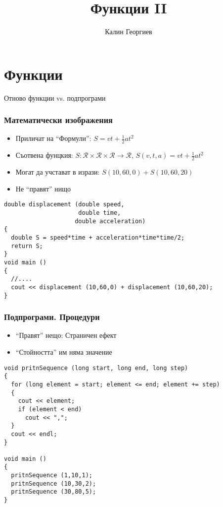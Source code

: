\documentclass{beamer}
\begin{document}
\title[Увод в програмирането]{Функции II}
\author{Калин Георгиев}
\frame{\titlepage}


\section{Функции}


\begin{frame}
\centerline{Отново функции vs. подпрограми}
\end{frame}



\begin{frame}[fragile]
\frametitle{Математически изображения}

\begin{itemize}
  \item Приличат на ``Формули'': $S=vt + \frac{1}{2}at^2$
\pause
  \item Съотвена фунцкия: $S:\mathcal{R}\times\mathcal{R}\times\mathcal{R}\rightarrow\mathcal{R}$, $S(v,t,a)=vt + \frac{1}{2}at^2$
\pause
  \item Могат да учстават в изрази: $S(10,60,0) + S(10,60,20)$
\pause
  \item Не ``правят'' нищо
\end{itemize}
\pause

\begin{flushleft}
\begin{lstlisting}
double displacement (double speed,
                     double time,
                    double acceleration)
{
  double S = speed*time + acceleration*time*time/2;
  return S;
}
void main ()
{
  //....
  cout << displacement (10,60,0) + displacement (10,60,20);
}

\end{lstlisting}

\end{flushleft}
\end{frame}


\begin{frame}[fragile]
\frametitle{Подпрограми. Процедури}

\begin{itemize}
  \item ``Правят'' нещо: Страничен ефект
  \item ``Стойността'' им няма значение
\end{itemize}



\begin{flushleft}
\begin{lstlisting}
void pritnSequence (long start, long end, long step)
{
  for (long element = start; element <= end; element += step)
  {
    cout << element;
    if (element < end)
      cout << ",";
  }
  cout << endl;
}

void main ()
{
  pritnSequence (1,10,1);
  pritnSequence (10,30,2);
  pritnSequence (30,80,5);
}
\end{lstlisting}

\end{flushleft}

\end{frame}
\end{document}
